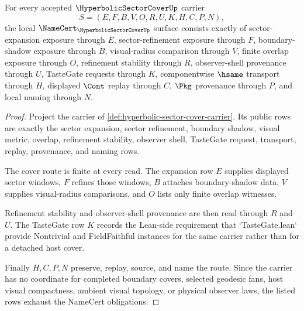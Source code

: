 \begin{theorem}
\label{thm:hyperbolic-sector-cover-namecert-obligations}
For every accepted $\HyperbolicSectorCoverUp$ carrier
$$
S=(E,F,B,V,O,R,U,K,H,C,P,N),
$$
the local $\NameCert_{\HyperbolicSectorCoverUp}$ surface consists exactly of sector-expansion exposure through $E$, sector-refinement exposure through $F$, boundary-shadow exposure through $B$, visual-radius comparison through $V$, finite overlap exposure through $O$, refinement stability through $R$, observer-shell provenance through $U$, TasteGate requests through $K$, componentwise $\hsame$ transport through $H$, displayed $\Cont$ replay through $C$, $\Pkg$ provenance through $P$, and local naming through $N$.
\end{theorem}
\begin{proof}
Project the carrier of \autoref{def:hyperbolic-sector-cover-carrier}. Its public rows are exactly the sector expansion, sector refinement, boundary shadow, visual metric, overlap, refinement stability, observer shell, TasteGate request, transport, replay, provenance, and naming rows.

The cover route is finite at every read. The expansion row $E$ supplies displayed sector windows, $F$ refines those windows, $B$ attaches boundary-shadow data, $V$ supplies visual-radius comparisons, and $O$ lists only finite overlap witnesses.

Refinement stability and observer-shell provenance are then read through $R$ and $U$. The TasteGate row $K$ records the Lean-side requirement that `TasteGate.lean` provide Nontrivial and FieldFaithful instances for the same carrier rather than for a detached host cover.

Finally $H,C,P,N$ preserve, replay, source, and name the route. Since the carrier has no coordinate for completed boundary covers, selected geodesic fans, host visual compactness, ambient visual topology, or physical observer laws, the listed rows exhaust the NameCert obligations.
\end{proof}

